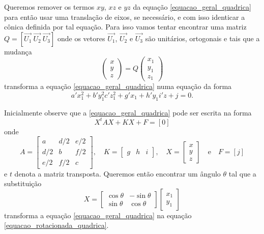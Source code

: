 Queremos remover os termos $xy$, $xz$ e $yz$ da equa\c{c}\~ao \eqref{equacao_geral_quadrica} para ent\~ao usar uma transla\c{c}\~ao de eixos, se necess\'ario, e com isso identicar a c\^onica definida por tal equa\c{c}\~ao. Para isso vamos tentar encontrar uma matriz $Q = [\vec{U_1}\ \vec{U_2}\ \vec{U_3}]$ onde os vetores $\vec{U_1}$, $\vec{U_2}$ e $\vec{U_3}$ são unitários, ortogonais e tais que a mudança
\begin{equation}
	\begin{pmatrix}
		x\\
		y\\
		z
	\end{pmatrix} = Q \begin{pmatrix}
		x_1\\
		y_1\\
		z_1
	\end{pmatrix}
\end{equation}
transforma a equa\c{c}\~ao \eqref{equacao_geral_quadrica} numa equa\c{c}\~ao da forma
\begin{equation}\label{equacao_rotacionada_quadrica}
  a'x_1^2 + b'y_1^2 c'z_1^2 + g'x_1 + h'y_1 i'z + j = 0.
\end{equation}

Inicialmente observe que a \eqref{equacao_geral_quadrica} pode ser escrita na forma
\begin{equation}\label{equacao_matricial_quadrica}
  X^tAX + KX + F = [0]
\end{equation}
onde
\[
  A = \begin{bmatrix}
    a & d/2 & e/2\\
    d/2 & b & f/2\\
    e/2 & f/2 & c
  \end{bmatrix}
, \quad K = \begin{bmatrix}
  g & h & i
\end{bmatrix}, \quad X = \begin{bmatrix}
  x\\
  y\\
  z
\end{bmatrix}\quad\mbox{e}\quad F = [j]
\]
e $t$ denota a matriz transposta. Queremos ent\~ao encontrar um \^angulo $\theta$ tal que a substitui\c{c}\~ao
\begin{equation}\label{substituicao_rotacao_de_eixos_espaco}
  X = \begin{bmatrix}
    \cos\theta & -\sin\theta\\
    \sin\theta & \cos\theta
  \end{bmatrix}\begin{bmatrix}
    x_1\\y_1
  \end{bmatrix}
\end{equation}
transforma a equa\c{c}\~ao \eqref{equacao_geral_quadrica} na equa\c{c}\~ao \eqref{equacao_rotacionada_quadrica}.

